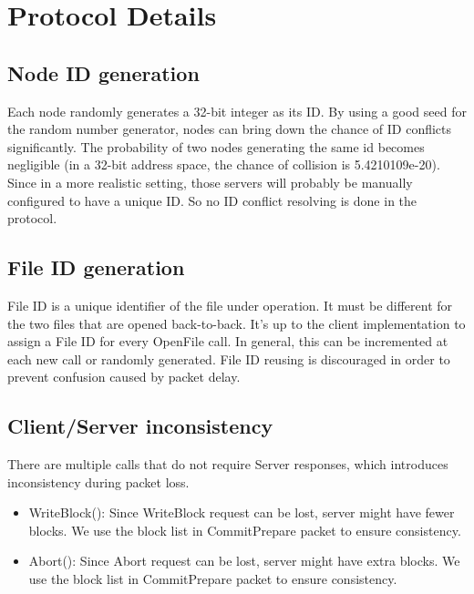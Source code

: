 \documentclass[11pt]{article} %
\begin{document}
\section{Protocol Details}

\subsection{Node ID generation}
Each node randomly generates a 32-bit integer as its ID.
By using a good seed for the random number generator, 
nodes can bring down the chance of ID conflicts significantly. 
The probability of two nodes generating the same id becomes negligible 
(in a 32-bit address space, the chance of collision is 5.4210109e-20).
Since in a more realistic setting, those servers will probably be manually configured 
to have a unique ID. So no ID conflict resolving is done in the protocol.

\subsection{File ID generation}
File ID is a unique identifier of the file under operation. 
It must be different for the two files that are opened back-to-back.
It's up to the client implementation to assign a File ID for every OpenFile call.
In general, this can be incremented at each new call or randomly generated.
File ID reusing is discouraged in order to prevent confusion caused by packet delay.

\subsection{Client/Server inconsistency}
There are multiple calls that do not require Server responses, 
which introduces inconsistency during packet loss.
\begin{itemize}
    \item WriteBlock(): Since WriteBlock request can be lost, 
        server might have fewer blocks.
        We use the block list in CommitPrepare packet to ensure consistency.
    \item Abort(): Since Abort request can be lost, 
        server might have extra blocks.
        We use the block list in CommitPrepare packet to ensure consistency.
\end{itemize}
\end{document}
